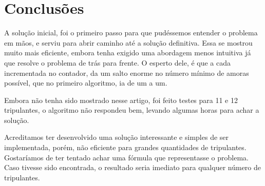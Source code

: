 \documentclass[12pt]{article}
\begin{document}
\section{Conclusões}

A solução inicial, foi o primeiro passo para que pudéssemos entender o problema em mãos, e serviu para abrir caminho até a solução definitiva. Essa se mostrou muito mais eficiente, embora tenha exigido uma abordagem menos intuitiva já que resolve o problema de trás para frente. O esperto dele, é que a cada incrementada no contador, da um salto enorme no número mínimo de amoras possível, que no primeiro algoritmo, ia de um a um.

Embora não tenha sido mostrado nesse artigo, foi feito testes para 11 e 12 tripulantes, o algoritmo não respondeu bem, levando algumas horas para achar a solução.

Acreditamos ter desenvolvido uma solução interessante e simples de ser implementada, porém, não eficiente para grandes quantidades de tripulantes. Gostaríamos de ter tentado achar uma fórmula que representasse o problema. Caso tivesse sido encontrada, o resultado seria imediato para qualquer número de tripulantes.
\end{document}
